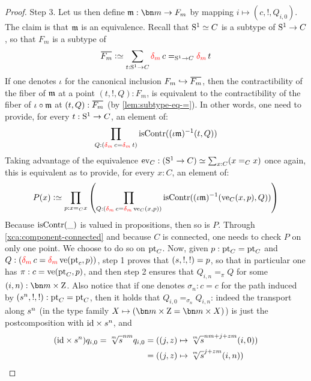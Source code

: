 \begin{proof}
  {\sc Step 3.} Let us then define $\myq: \bn m \to F_m$ by mapping
  $i \mapsto (c,!,Q_{i,0})$. The claim is that $\mathfrak m$ is an
  equivalence. Recall that ${\mathrm{S}^1} \simeq C$ is a subtype of ${\mathrm{S}^1} \to C$,
  so that $F_m$ is a subtype of
  \begin{displaymath}
    \casoverline {F_m} \defequi \sum_{t:\Sc \to C}\dg{m}c=_{\Sc\to C}\dg{m}t
  \end{displaymath}
  If one denotes $\iota$ for the canonical inclusion
  $F_m\mono \casoverline{F_m}$, then the contractibility of the fiber of
  $\mathfrak m$ at a point $(t,!,Q):F_m$, is equivalent to the
  contractibility of the fiber of $\iota\circ\mathfrak m$ at
  $(t,Q):\casoverline{F_m}$ (by \cref{lem:subtype-eq-=}).  In other
  words, one need to provide, for every $t:{\mathrm{S}^1} \to C$, an element of:
  \begin{displaymath}
    \prod_{Q:(\dg{m}c=\dg{m}t)} \iscontr(\inv {(\iota \myq)} (t,Q)) 
  \end{displaymath}
  Taking advantage of the equivalence
  $\ev_C: (\Sc \to C) \weq \sum_{x:C}(x=_Cx)$ once again, this is
  equivalent as to provide, for every $x:C$, an element of:
  \begin{displaymath}
    P(x) \defequi \prod_{p:x=_Cx}
    \left(
      \prod_{Q:(\dg{m}c=\dg{m}\ve_C(x,p))} \iscontr(\inv {(\iota \myq)} (\ve_C(x,p),Q))
    \right) 
  \end{displaymath}
  Because $\iscontr(\blank)$ is valued in propositions, then so is
  $P$. Through \cref{xca:component-connected} and because $C$ is
  connected, one needs to check $P$ on only one point. We choose to do
  so on $\mathrm{pt}_C$. Now, given $p:\mathrm{pt}_C = \mathrm{pt}_C$ and
  $Q:(\dg{m}c=\dg{m}\ve(\pt_c,p))$, step 1 proves that
  $({s}, !,!)=p$, so that in particular one has
  $\pi:c=\ve(\pt_C,p)$, and then step 2 ensures that $Q_{i,n}=_\pi Q$
  for some $(i,n):\bn m \times \zet$. Also notice that if one denotes
  $\sigma_n:c = c$ for the path induced by $({s}^n,!,!): \mathrm{pt}_C=\mathrm{pt}_C$,
  then it holds that $Q_{i,0}=_{\sigma_n}Q_{i,n}$: indeed the
  transport along ${s}^n$ (in the type family
  $X \mapsto (\bn m\times \zet = \bn m\times X)$) is just the
  postcomposition with $\mathord{\mathrm{id}} \times {s}^n$, and
  \begin{displaymath}
    \begin{split}
      (\id\times s^n) q_{i,0} = \sqrt[\uproot{2}m]s^{nm}q_{i,0} &= ((j,z)\mapsto \sqrt[\uproot{2}m]s^{nm+j+zm}(i,0))\\
      &= ((j,z)\mapsto \sqrt[\uproot{2}m]s^{j+zm}(i,n)) \\

\end{split}
\end{displaymath}
\end{proof}
